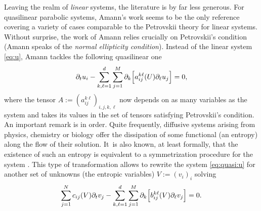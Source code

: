 \documentclass[10pt]{amsart}
\theoremstyle{definition}
\begin{document}
Leaving the realm of \emph{linear} systems, the literature is by far less generous. For quasilinear parabolic systems, Amann's work \cite{amann} seems to be the only reference covering a variety of cases comparable to the Petrovskii theory for linear systems. Without surprise, the work of Amann relies crucially on Petrovskii's condition (Amann speaks of the \emph{normal ellipticity condition}). Instead of the linear system \eqref{eq:u}, Amann tackles the following quasilinear one\vspace*{-3pt}\enlargethispage{.5\baselineskip}
\begin{align}\label{eq:quasi:u}
\partial_t u_i - \sum_{k,\ell=1}^d\sum_{j=1}^M \partial_k \Bigl[a_{ij}^{k\ell}(U) \partial_\ell u_j \Bigr] = 0,
\end{align}
where the tensor $A:=(a_{ij}^{k\ell})_{i,j,k,\ell}$ now depends on as many variables as the system and takes its values in the set of tensors satisfying Petrovskii's condition. An important remark is in order. Quite frequently, diffusive systems arising from physics, chemistry or biology offer the dissipation of some functional (an entropy) along the flow of their solution. It~is also known, at least formally, that the existence of such an entropy is equivalent to a symmetrization procedure for the system \cite{degond,kawashizu,kawa}. This type of transformation allows to rewrite the system \eqref{eq:quasi:u} for another set of unknowns (the entropic variables) $V:=(v_i)_i$ solving\vspace*{-3pt}
\begin{align}\label{eq:u:symm}
\sum_{j=1}^N c_{ij}(V) \partial_t v_j - \sum_{k,\ell=1}^d\sum_{j=1}^M \partial_k \Bigl[b_{ij}^{k\ell}(V) \partial_\ell v_j \Bigr] = 0.
\end{align}
\end{document}

